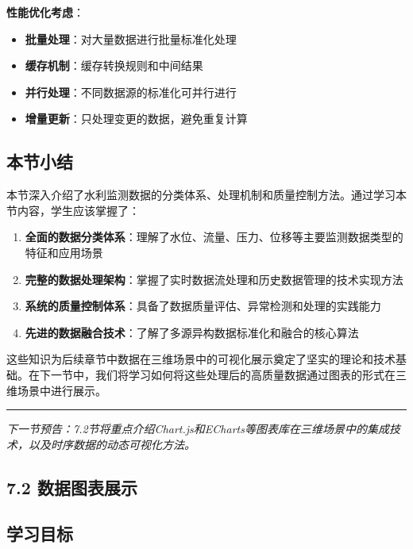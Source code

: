 \textbf{性能优化考虑}：

\begin{itemize}
\tightlist
\item
  \textbf{批量处理}：对大量数据进行批量标准化处理
\item
  \textbf{缓存机制}：缓存转换规则和中间结果
\item
  \textbf{并行处理}：不同数据源的标准化可并行进行
\item
  \textbf{增量更新}：只处理变更的数据，避免重复计算
\end{itemize}

\subsection{本节小结}\label{ux672cux8282ux5c0fux7ed3}

本节深入介绍了水利监测数据的分类体系、处理机制和质量控制方法。通过学习本节内容，学生应该掌握了：

\begin{enumerate}
\def\labelenumi{\arabic{enumi}.}
\tightlist
\item
  \textbf{全面的数据分类体系}：理解了水位、流量、压力、位移等主要监测数据类型的特征和应用场景
\item
  \textbf{完整的数据处理架构}：掌握了实时数据流处理和历史数据管理的技术实现方法
\item
  \textbf{系统的质量控制体系}：具备了数据质量评估、异常检测和处理的实践能力
\item
  \textbf{先进的数据融合技术}：了解了多源异构数据标准化和融合的核心算法
\end{enumerate}

这些知识为后续章节中数据在三维场景中的可视化展示奠定了坚实的理论和技术基础。在下一节中，我们将学习如何将这些处理后的高质量数据通过图表的形式在三维场景中进行展示。

\begin{center}\rule{0.5\linewidth}{0.5pt}\end{center}

\emph{下一节预告：7.2节将重点介绍Chart.js和ECharts等图表库在三维场景中的集成技术，以及时序数据的动态可视化方法。}

\subsection{7.2 数据图表展示}\label{ux6570ux636eux56feux8868ux5c55ux793a}

\subsection{学习目标}\label{ux5b66ux4e60ux76eeux6807-2}

